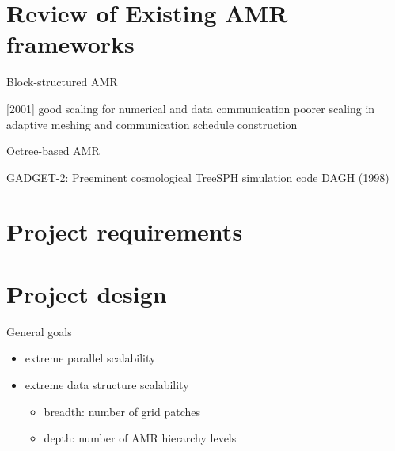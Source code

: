 \documentclass{article}
\begin{document}
\section{Review of Existing AMR frameworks}


  Block-structured AMR


   [2001]
   good scaling for numerical and data communication
   poorer scaling in adaptive meshing and communication schedule construction 


  Octree-based AMR

GADGET-2: Preeminent cosmological TreeSPH simulation code
DAGH (1998)

\section{Project requirements}

\section{Project design}

General goals

\begin{itemize}
\item extreme parallel scalability
\item extreme data structure scalability
  \begin{itemize}
  \item breadth: number of grid patches
  \item depth: number of AMR hierarchy levels
  \end{itemize}
\end{itemize}
\end{document}
